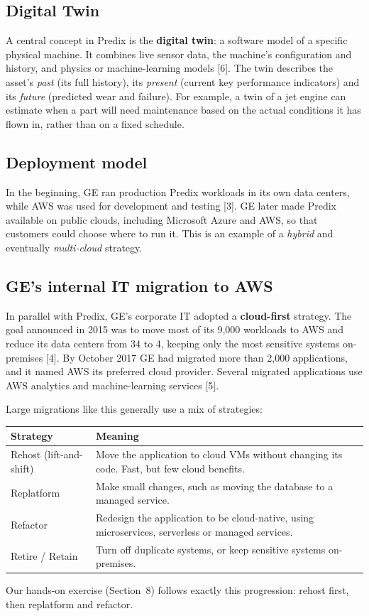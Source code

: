 \documentclass[12pt,a4paper]{article}
\begin{document}
\subsection{Digital Twin}
A central concept in Predix is the \textbf{digital twin}: a software model of a specific physical machine. It
combines live sensor data, the machine's configuration and history, and physics or machine-learning models [6]. The
twin describes the asset's \emph{past} (its full history), its \emph{present} (current key performance indicators) and
its \emph{future} (predicted wear and failure). For example, a twin of a jet engine can estimate when a part will need
maintenance based on the actual conditions it has flown in, rather than on a fixed schedule.

\subsection{Deployment model}
In the beginning, GE ran production Predix workloads in its own data centers, while AWS was used for development and
testing [3]. GE later made Predix available on public clouds, including Microsoft Azure and AWS, so that customers
could choose where to run it. This is an example of a \emph{hybrid} and eventually \emph{multi-cloud} strategy.

\subsection{GE's internal IT migration to AWS}
In parallel with Predix, GE's corporate IT adopted a \textbf{cloud-first} strategy. The goal announced in 2015 was to
move most of its 9,000 workloads to AWS and reduce its data centers from 34 to 4, keeping only the most sensitive
systems on-premises [4]. By October 2017 GE had migrated more than 2,000 applications, and it named AWS its preferred
cloud provider. Several migrated applications use AWS analytics and machine-learning services [5].

Large migrations like this generally use a mix of strategies:
\begin{center}
\begin{tabularx}{\linewidth}{@{}p{3.4cm}L@{}}
\toprule
\textbf{Strategy} & \textbf{Meaning} \\
\midrule
Rehost (lift-and-shift) & Move the application to cloud VMs without changing its code. Fast, but few cloud benefits. \\
Replatform & Make small changes, such as moving the database to a managed service. \\
Refactor & Redesign the application to be cloud-native, using microservices, serverless or managed services. \\
Retire / Retain & Turn off duplicate systems, or keep sensitive systems on-premises. \\
\bottomrule
\end{tabularx}
\end{center}
Our hands-on exercise (Section~8) follows exactly this progression: rehost first, then replatform and refactor.
\end{document}
